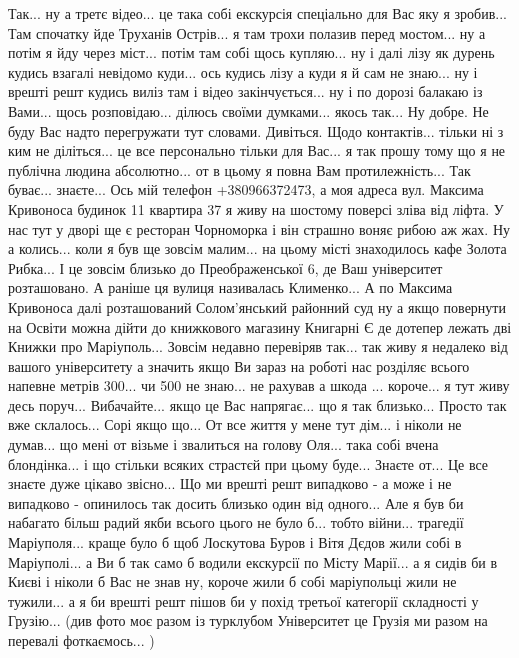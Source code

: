 Так... ну а третє відео... це така собі екскурсія спеціально для Вас яку я
зробив... Там спочатку йде Труханів Острів... я там трохи полазив перед
мостом... ну а потім я йду через міст... потім там собі щось купляю... ну і
далі лізу як дурень кудись взагалі невідомо куди... ось кудись лізу а куди я й
сам не знаю... ну і врешті решт кудись виліз там і відео закінчується... ну і
по дорозі балакаю із Вами... щось розповідаю... ділюсь своїми думками... якось
так... Ну добре. Не буду Вас надто перегружати тут словами. Дивіться. Щодо
контактів... тільки ні з ким не діліться... це все персонально тільки для
Вас... я так прошу тому що я не публічна людина абсолютно... от в цьому я повна
Вам протилежність... Так буває... знаєте... Ось мій телефон +380966372473, а
моя адреса вул. Максима Кривоноса будинок 11 квартира 37 я живу на шостому
поверсі зліва від ліфта. У нас тут у дворі ще є ресторан Чорноморка і він
страшно воняє рибою аж жах. Ну а колись... коли я був ще зовсім малим... на
цьому місті знаходилось кафе Золота Рибка... І це зовсім близько до
Преображенської 6, де Ваш університет розташовано. А раніше ця вулиця
називалась Клименко... А по Максима Кривоноса далі розташований Солом'янський
районний суд ну а якщо повернути на Освіти можна дійти до книжкового магазину
Книгарні Є де дотепер лежать дві Книжки про Маріуполь... Зовсім недавно
перевіряв так... так живу я недалеко від вашого університету а значить якщо Ви
зараз на роботі нас розділяє всього напевне метрів 300...  чи 500 не знаю... не
рахував а шкода ... короче... я тут живу десь поруч... Вибачайте... якщо це Вас
напрягає... що я так близько... Просто так вже склалось... Сорі якщо що... От
все життя у мене тут дім... і ніколи не думав... що мені от візьме і звалиться
на голову Оля... така собі вчена блондінка... і що стільки всяких страстєй при
цьому буде... Знаєте от... Це все знаєте дуже цікаво звісно... Що ми врешті
решт випадково - а може і не випадково - опинилось так досить близько один від
одного... Але я був би набагато більш радий якби всього цього не було б...
тобто війни... трагедії Маріуполя... краще було б щоб Лоскутова Буров і Вітя
Дєдов жили собі в Маріуполі... а Ви б так само б водили екскурсії по Місту
Марії... а я сидів би в Києві і ніколи б Вас не знав ну, короче жили б собі
маріупольці жили не тужили... а я би врешті решт пішов би у похід третьої
категорії складності у Грузію...  (див фото моє разом із турклубом Університет
це Грузія ми разом на перевалі фоткаємось... )

